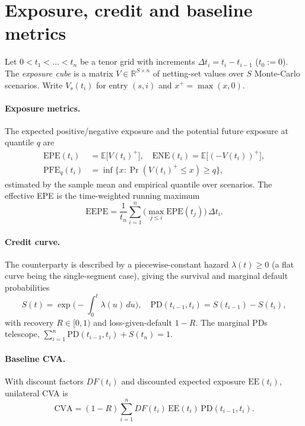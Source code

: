 \documentclass[twocolumn,10pt]{article}
\newcommand{\E}{\mathbb{E}}
\newcommand{\PD}{\mathrm{PD}}
\newcommand{\EPE}{\mathrm{EPE}}
\newcommand{\ENE}{\mathrm{ENE}}
\newcommand{\PFE}{\mathrm{PFE}}
\newcommand{\EEPE}{\mathrm{EEPE}}
\newcommand{\EE}{\mathrm{EE}}
\newcommand{\CVA}{\mathrm{CVA}}
\begin{document}
\section{Exposure, credit and baseline metrics}\label{sec:model}
Let $0<t_1<\dots<t_n$ be a tenor grid with increments $\Delta t_i=t_i-t_{i-1}$
($t_0:=0$). The \emph{exposure cube} is a matrix $V\in\mathbb{R}^{S\times n}$ of
netting-set values over $S$ Monte-Carlo scenarios. Write $V_s(t_i)$ for entry
$(s,i)$ and $x^{+}=\max(x,0)$.

\paragraph{Exposure metrics.} The expected positive/negative exposure and the
potential future exposure at quantile $q$ are
\begin{align}
\EPE(t_i) &= \E\!\big[V(t_i)^{+}\big],\quad
\ENE(t_i) = \E\!\big[(-V(t_i))^{+}\big],\\
\PFE_q(t_i) &= \inf\{x:\Pr(V(t_i)^{+}\le x)\ge q\},
\end{align}
estimated by the sample mean and empirical quantile over scenarios. The
effective EPE is the time-weighted running maximum
\begin{equation}
\EEPE = \frac{1}{t_n}\sum_{i=1}^{n}\Big(\max_{j\le i}\EPE(t_j)\Big)\,\Delta t_i .
\end{equation}

\paragraph{Credit curve.} The counterparty is described by a piecewise-constant
hazard $\lambda(t)\ge 0$ (a flat curve being the single-segment case), giving the
survival and marginal default probabilities
\begin{equation}
S(t)=\exp\!\Big(-\!\int_0^t\!\lambda(u)\,du\Big),\quad
\PD(t_{i-1},t_i)=S(t_{i-1})-S(t_i),
\end{equation}
with recovery $R\in[0,1)$ and loss-given-default $1-R$. The marginal PDs
telescope, $\sum_{i=1}^{n}\PD(t_{i-1},t_i)+S(t_n)=1$.

\paragraph{Baseline CVA.} With discount factors $DF(t_i)$ and discounted
expected exposure $\EE(t_i)$, unilateral CVA is
\begin{equation}\label{eq:cva}
\CVA=(1-R)\sum_{i=1}^{n}DF(t_i)\,\EE(t_i)\,\PD(t_{i-1},t_i).
\end{equation}
\end{document}
